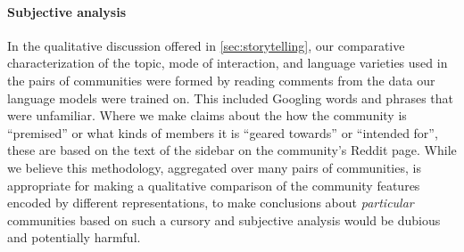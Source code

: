 \documentclass[11pt]{article}
\begin{document}
\paragraph{Subjective analysis}
In the qualitative discussion offered in \cref{sec:storytelling},
our comparative characterization of the topic, mode of interaction, 
and language varieties
used in the pairs of communities were formed by reading comments from the data our 
language models were trained on. This included Googling words and phrases that 
were unfamiliar. 
Where we make claims about the how the community is ``premised'' or what kinds of 
members it is ``geared towards'' or ``intended for'', these are based on the text
of the sidebar on the community's Reddit page.
While we believe this methodology, aggregated over many pairs of communities, 
is appropriate for making a qualitative comparison
of the community features encoded by different representations, 
to make conclusions about \emph{particular} communities based on such a cursory and
subjective analysis would be dubious and potentially harmful.





\end{document}
